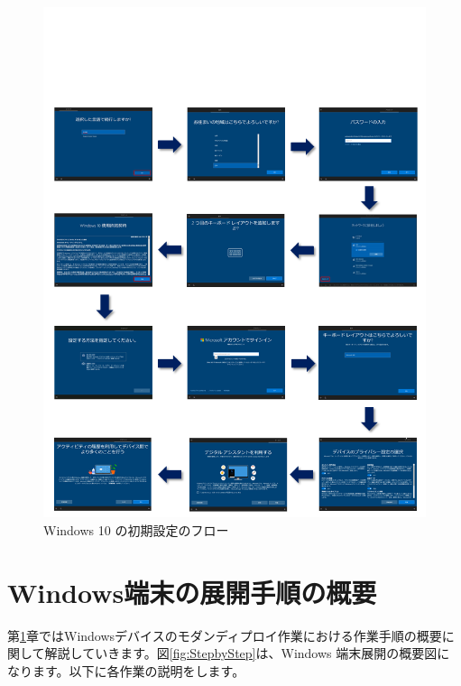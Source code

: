 \begin{figure}[t]
    \centering
    \vspace{-6cm}
    \includegraphics[width=17cm]{figures/Win10_Kitting.png}
    \caption{Windows 10 の初期設定のフロー}
    \label{fig:Win10_Kitting}
\end{figure}


\chapter{Windows端末の展開手順の概要}
\label{chap:Windows端末の展開手順の概要}

第\ref{chap:Windows端末の展開手順の概要}章ではWindowsデバイスのモダンディプロイ作業における作業手順の概要に関して解説していきます。図\ref{fig:StepbyStep}は、Windows 端末展開の概要図になります。以下に各作業の説明をします。

